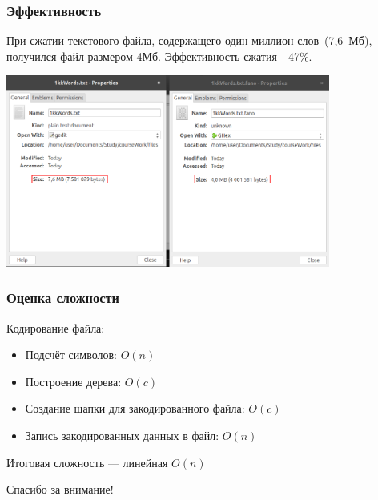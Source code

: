 \documentclass[10pt,pdf,hyperref={unicode}]{beamer}
\begin{document}
\begin{frame}
	\frametitle{Эффективность}
		При сжатии текстового файла, содержащего один миллион слов~(7,6~Мб), 
		получился файл размером 4Мб. Эффективность сжатия - 47\%.\newline

		\centering
		\includegraphics[width=0.8\textwidth]{compare.png}
\end{frame}

\begin{frame}
	\frametitle{Оценка сложности}
	Кодирование файла:\\ 
	\begin{itemize}
		\item Подсчёт символов: $O(n)$
		\item Построение дерева: $O(c)$
		\item Создание шапки для закодированного файла: $O(c)$
		\item Запись закодированных данных в файл: $O(n)$
	\end{itemize}
	Итоговая сложность --- линейная $O(n)$
\end{frame}

\begin{frame}
	\centerline{Спасибо за внимание!}
\end{frame}
\end{document}
